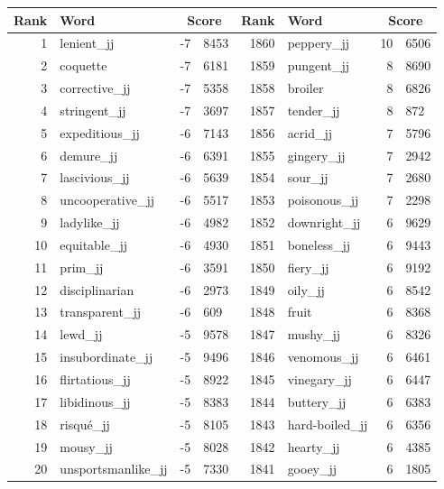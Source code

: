 \begin{table}[tbp]
    \begin{tabular}{| rlr@{.}l | rlr@{.}l |}
    \hline
    \textbf{Rank} & \textbf{Word} & \multicolumn{2}{c|}{\textbf{Score}} & \textbf{Rank} & \textbf{Word} & \multicolumn{2}{c|}{\textbf{Score}} \\
    \hline
    1 & lenient\_jj & -7 & 8453    &    1860 & peppery\_jj & 10 & 6506 \\
    2 & coquette & -7 & 6181    &    1859 & pungent\_jj & 8 & 8690 \\
    3 & corrective\_jj & -7 & 5358    &    1858 & broiler & 8 & 6826 \\
    4 & stringent\_jj & -7 & 3697    &    1857 & tender\_jj & 8 & 872 \\
    5 & expeditious\_jj & -6 & 7143    &    1856 & acrid\_jj & 7 & 5796 \\
    6 & demure\_jj & -6 & 6391    &    1855 & gingery\_jj & 7 & 2942 \\
    7 & lascivious\_jj & -6 & 5639    &    1854 & sour\_jj & 7 & 2680 \\
    8 & uncooperative\_jj & -6 & 5517    &    1853 & poisonous\_jj & 7 & 2298 \\
    9 & ladylike\_jj & -6 & 4982    &    1852 & downright\_jj & 6 & 9629 \\
    10 & equitable\_jj & -6 & 4930    &    1851 & boneless\_jj & 6 & 9443 \\
    11 & prim\_jj & -6 & 3591    &    1850 & fiery\_jj & 6 & 9192 \\
    12 & disciplinarian & -6 & 2973    &    1849 & oily\_jj & 6 & 8542 \\
    13 & transparent\_jj & -6 & 609    &    1848 & fruit & 6 & 8368 \\
    14 & lewd\_jj & -5 & 9578    &    1847 & mushy\_jj & 6 & 8326 \\
    15 & insubordinate\_jj & -5 & 9496    &    1846 & venomous\_jj & 6 & 6461 \\
    16 & flirtatious\_jj & -5 & 8922    &    1845 & vinegary\_jj & 6 & 6447 \\
    17 & libidinous\_jj & -5 & 8383    &    1844 & buttery\_jj & 6 & 6383 \\
    18 & risqué\_jj & -5 & 8105    &    1843 & hard-boiled\_jj & 6 & 6356 \\
    19 & mousy\_jj & -5 & 8028    &    1842 & hearty\_jj & 6 & 4385 \\
    20 & unsportsmanlike\_jj & -5 & 7330    &    1841 & gooey\_jj & 6 & 1805 \\

\end{tabular}
\end{table}
